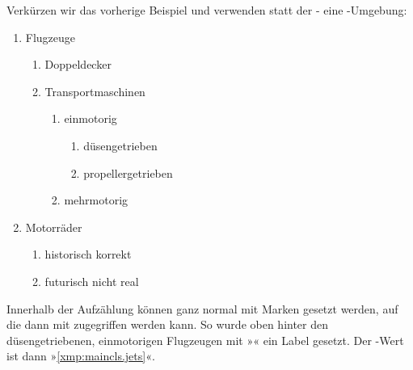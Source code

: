     \begin{Example}
      Verkürzen wir das vorherige Beispiel und verwenden statt der
      - eine
      -Umgebung:
      \begin{ShowOutput}[\baselineskip]
        \begin{enumerate}
        \item Flugzeuge
          \begin{enumerate}
          \item Doppeldecker
          \item Transportmaschinen
            \begin{enumerate}
            \item einmotorig
              \begin{enumerate}
              \item{düsengetrieben}\label{xmp:maincls.jets}
              \item{propellergetrieben}
              \end{enumerate}
            \item mehrmotorig
            \end{enumerate}
          \end{enumerate}
        \item Motorräder
          \begin{enumerate}
          \item historisch korrekt
          \item futurisch nicht real
          \end{enumerate}
        \end{enumerate}
      \end{ShowOutput}
      Innerhalb der Aufzählung können ganz normal mit  Marken
      gesetzt werden, auf die dann mit  zugegriffen werden
      kann. So wurde oben hinter den düsengetriebenen, einmotorigen
      Flugzeugen mit »« ein Label
      gesetzt. Der -Wert ist dann »\ref{xmp:maincls.jets}«.
    \end{Example}%
  \fi
  \EndIndexGroup


